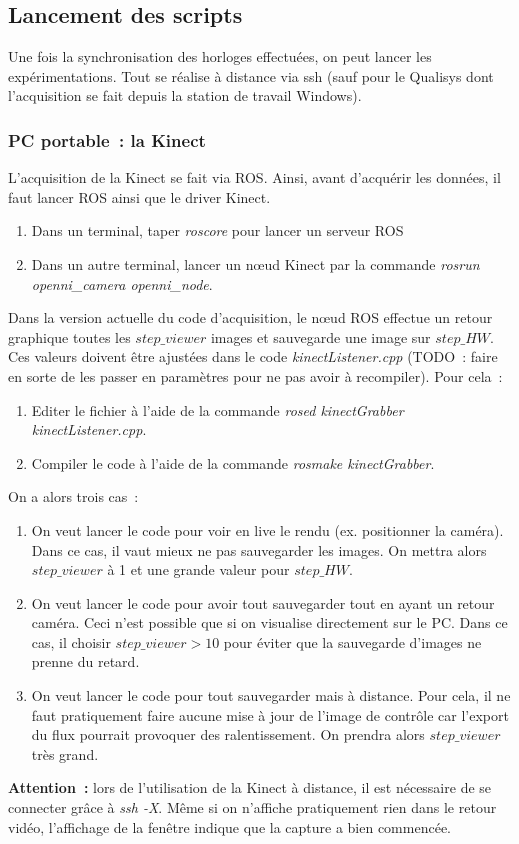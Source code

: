 \documentclass[a4paper, 10pt ]{article}
\begin{document}
\subsection{Lancement des scripts}
Une fois la synchronisation des horloges effectuées, on peut lancer les expérimentations. Tout se réalise à distance via ssh (sauf pour le Qualisys dont l'acquisition se fait depuis la station de travail Windows).
\subsubsection{PC portable~: la Kinect}
L'acquisition de la Kinect se fait via ROS. Ainsi, avant d'acquérir les données, il faut lancer ROS ainsi que le driver Kinect.
\begin{enumerate}
	\item Dans un terminal, taper \emph{roscore} pour lancer un serveur ROS
	\item Dans un autre terminal, lancer un n{\oe}ud Kinect par la commande \linebreak \emph{rosrun openni{\_}camera openni{\_}node}.
\end{enumerate}
Dans la version actuelle du code d'acquisition, le n{\oe}ud ROS effectue un retour \linebreak graphique toutes les $step\_viewer$ images et sauvegarde une image sur $step\_HW$. Ces valeurs doivent être ajustées dans le code \emph{kinectListener.cpp} (TODO~: faire en sorte de les passer en paramètres pour ne pas avoir à recompiler). Pour cela~:
\begin{enumerate}
	\item Editer le fichier à l'aide de la commande \emph{rosed kinectGrabber kinectListener.cpp}.
	\item Compiler le code à l'aide de la commande \emph{rosmake kinectGrabber}.
\end{enumerate}
On a alors trois cas~:
\begin{enumerate}
	\item On veut lancer le code pour voir en live le rendu (ex. positionner la caméra). Dans ce cas, il vaut mieux ne pas sauvegarder les images. On mettra alors $step\_viewer$ à 1 et une grande valeur pour $step\_HW$.
	\item On veut lancer le code pour avoir tout sauvegarder tout en ayant un retour caméra. Ceci n'est possible que si on visualise directement sur le PC. Dans ce cas, il choisir $step\_viewer>10$ pour éviter que la sauvegarde d'images ne prenne du retard.
	\item On veut lancer le code pour tout sauvegarder mais à distance. Pour cela, il ne faut pratiquement faire aucune mise à jour de l'image de contrôle car l'export du flux pourrait provoquer des ralentissement. On prendra alors $step\_viewer$ très grand. 
\end{enumerate}
\textbf{Attention~:} lors de l'utilisation de la Kinect à distance, il est nécessaire de se connecter grâce à \emph{ssh -X}. Même si on n'affiche pratiquement rien dans le retour vidéo, l'affichage de la fenêtre indique que la capture a bien commencée.
\end{document}
